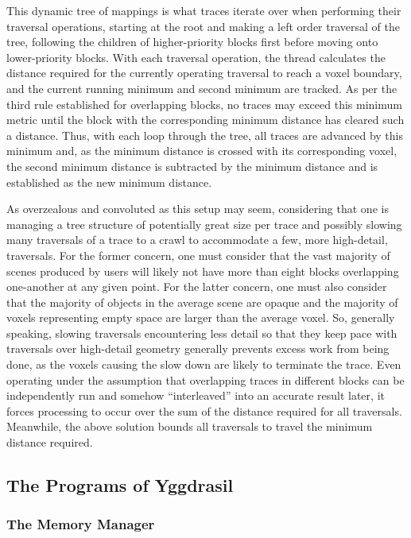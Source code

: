\documentclass[onecolumn, draftclsnofoot,10pt, compsoc]{IEEEtran}
\begin{document}
This dynamic tree of mappings is what traces iterate over when performing their traversal operations, starting at the root and making a left order traversal of the tree, following the children of higher-priority blocks first before moving onto lower-priority blocks. With each traversal operation, the thread calculates the distance required for the currently operating traversal to reach a voxel boundary, and the current running minimum and second minimum are tracked. As per the third rule established for overlapping blocks, no traces may exceed this minimum metric until the block with the corresponding minimum distance has cleared such a distance. Thus, with each loop through the tree, all traces are advanced by this minimum and, as the minimum distance is crossed with its corresponding voxel, the second minimum distance is subtracted by the minimum distance and is established as the new minimum distance.

As overzealous and convoluted as this setup may seem, considering that one is managing a tree structure of potentially great size per trace and possibly slowing many traversals of a trace to a crawl to accommodate a few, more high-detail, traversals. For the former concern, one must consider that the vast majority of scenes produced by users will likely not have more than eight blocks overlapping one-another at any given point. For the latter concern, one must also consider that the majority of objects in the average scene are opaque and the majority of voxels representing empty space are larger than the average voxel. So, generally speaking, slowing traversals encountering less detail so that they keep pace with traversals over high-detail geometry generally prevents excess work from being done, as the voxels causing the slow down are likely to terminate the trace. Even operating under the assumption that overlapping traces in different blocks can be independently run and somehow “interleaved” into an accurate result later, it forces processing to occur over the sum of the distance required for all traversals. Meanwhile, the above solution bounds all traversals to travel the minimum distance required.



\subsection{The Programs of Yggdrasil}

\subsubsection{The Memory Manager}
\end{document}
